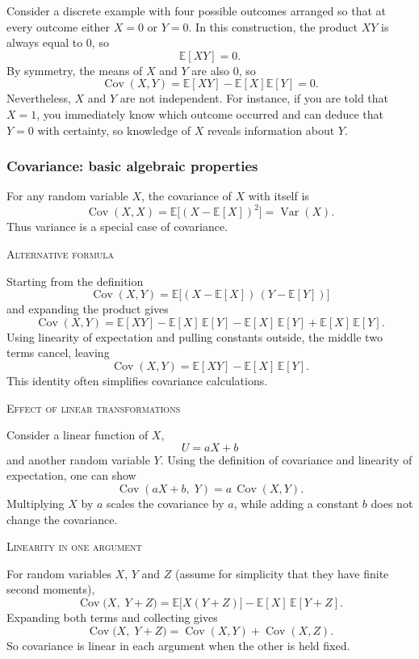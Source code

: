 Consider a discrete example with four possible outcomes arranged so that at every outcome either \(X=0\) or \(Y=0\).  
In this construction, the product \(XY\) is always equal to \(0\), so
\[
\mathbb{E}[XY] = 0.
\]
By symmetry, the means of \(X\) and \(Y\) are also \(0\), so
\[
\operatorname{Cov}(X,Y)
=
\mathbb{E}[XY] - \mathbb{E}[X]\mathbb{E}[Y]
=
0.
\]
Nevertheless, \(X\) and \(Y\) are not independent.  
For instance, if you are told that \(X=1\), you immediately know which outcome occurred and can deduce that \(Y=0\) with certainty, so knowledge of \(X\) reveals information about \(Y\).


\subsubsection{Covariance: basic algebraic properties}

For any random variable \(X\), the covariance of \(X\) with itself is
\[
\operatorname{Cov}(X,X)
=
\mathbb{E}\big[(X-\mathbb{E}[X])^{2}\big]
=
\operatorname{Var}(X).
\]
Thus variance is a special case of covariance.

\bigskip
\textsc{Alternative formula}

Starting from the definition
\[
\operatorname{Cov}(X,Y)
=
\mathbb{E}\big[(X-\mathbb{E}[X])\,(Y-\mathbb{E}[Y])\big]
\]
and expanding the product gives
\[
\operatorname{Cov}(X,Y)
=
\mathbb{E}[XY]
-
\mathbb{E}[X]\,\mathbb{E}[Y]
-
\mathbb{E}[X]\,\mathbb{E}[Y]
+
\mathbb{E}[X]\,\mathbb{E}[Y].
\]
Using linearity of expectation and pulling constants outside, the middle two terms cancel, leaving
\[
\operatorname{Cov}(X,Y)
=
\mathbb{E}[XY]
-
\mathbb{E}[X]\,\mathbb{E}[Y].
\]
This identity often simplifies covariance calculations.

\bigskip
\textsc{Effect of linear transformations}

Consider a linear function of \(X\),
\[
U = aX + b
\]
and another random variable \(Y\).  
Using the definition of covariance and linearity of expectation, one can show
\[
\operatorname{Cov}(aX+b,\;Y)
=
a\,\operatorname{Cov}(X,Y).
\]
Multiplying \(X\) by \(a\) scales the covariance by \(a\), while adding a constant \(b\) does not change the covariance.

\bigskip
\textsc{Linearity in one argument}

For random variables \(X\), \(Y\) and \(Z\) (assume for simplicity that they have finite second moments),
\[
\operatorname{Cov}\big(X,\;Y+Z\big)
=
\mathbb{E}\big[X(Y+Z)\big]
-
\mathbb{E}[X]\,\mathbb{E}[Y+Z].
\]
Expanding both terms and collecting gives
\[
\operatorname{Cov}\big(X,\;Y+Z\big)
=
\operatorname{Cov}(X,Y)
+
\operatorname{Cov}(X,Z).
\]
So covariance is linear in each argument when the other is held fixed.



